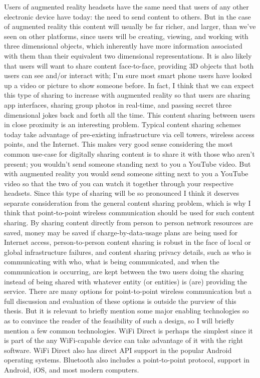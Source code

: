 \documentclass[12pt,dvips]{report}
\begin{document}
Users of augmented reality headsets have the same need that users of any other electronic device have today: the need to send content to others. But in the case of augmented reality this content will usually be far richer, and larger, than we've seen on other platforms, since users will be creating, viewing, and working with three dimensional objects, which inherently have more information associated with them than their equivalent two dimensional representations. It is also likely that users will want to share content face-to-face, providing 3D objects that both users can see and/or interact with; I'm sure most smart phone users have looked up a video or picture to show someone before. In fact, I think that we can expect this type of sharing to increase with augmented reality so that users are sharing app interfaces, sharing group photos in real-time, and passing secret three dimensional jokes back and forth all the time.
This content sharing between users in close proximity is an interesting problem. Typical content sharing schemes today take advantage of pre-existing infrastructure via cell towers, wireless access points, and the Internet. This makes very good sense considering the most common use-case for digitally sharing content is to share it with those who aren't present; you wouldn't send someone standing next to you a YouTube video. But with augmented reality you would send someone sitting next to you a YouTube video so that the two of you can watch it together through your respective headsets. Since this type of sharing will be so pronounced I think it deserves separate consideration from the general content sharing problem, which is why I think that point-to-point wireless communication should be used for such content sharing. By sharing content directly from person to person network resources are saved, money may be saved if charge-by-data-usage plans are being used for Internet access, person-to-person content sharing is robust in the face of local or global infrastructure failures, and content sharing privacy details, such as who is communicating with who, what is being communicated, and when the communication is occurring, are kept between the two users doing the sharing instead of being shared with whatever entity (or entities) is (are) providing the service. 
There are many options for point-to-point wireless communication but a full discussion and evaluation of these options is outside the purview of this thesis. But it is relevant to briefly mention some major enabling technologies so as to convince the reader of the feasibility of such a design, so I will briefly mention a few common technologies. WiFi Direct is perhaps the simplest since it is part of the any WiFi-capable device can take advantage of it with the right software. WiFi Direct also has direct API support in the popular Android operating systems. Bluetooth also includes a point-to-point protocol,  support in Android, iOS, and most modern computers. 
\end{document}
